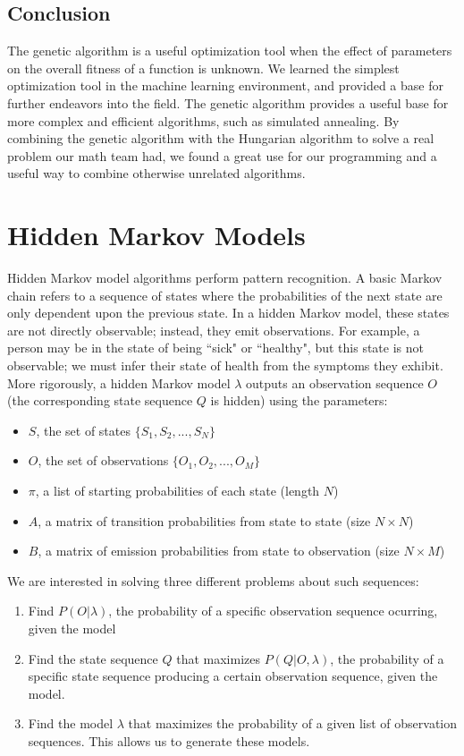 \documentclass[11pt,a4paper]{article}
\begin{document}
\subsection{Conclusion}
\label{Genetic Algorithms:Conclusion}

The genetic algorithm is a useful optimization tool when the effect of parameters on the overall fitness of a function is unknown. We learned the simplest optimization tool in the machine learning environment, and provided a base for further endeavors into the field. The genetic algorithm provides a useful base for more complex and efficient algorithms, such as simulated annealing. By combining the genetic algorithm with the Hungarian algorithm to solve a real problem our math team had, we found a great use for our programming and a useful way to combine otherwise unrelated algorithms.

\section{Hidden Markov Models} 
\label{Hidden Markov Models}

Hidden Markov model algorithms perform pattern recognition. A basic Markov chain refers to a sequence of states where the probabilities of the next state are only dependent upon the previous state. In a hidden Markov model, these states are not directly observable; instead, they emit observations. For example, a person may be in the state of being ``sick" or ``healthy", but this state is not observable; we must infer their state of health from the symptoms they exhibit. More rigorously, a hidden Markov model $\lambda$ outputs an observation sequence $O$ (the corresponding state sequence $Q$ is hidden) using the parameters:

\begin{itemize}
\item $S$, the set of states $\{S_1, S_2, ... , S_N\}$
\item $O$, the set of observations $\{O_1, O_2, ... , O_M\}$
\item $\pi$, a list of starting probabilities of each state (length $N$)
\item $A$, a matrix of transition probabilities from state to state (size $N \times N$)
\item $B$, a matrix of emission probabilities from state to observation (size $N \times M$) 
\end{itemize}

We are interested in solving three different problems about such sequences:
\begin{enumerate}
\item Find $P(O|\lambda)$, the probability of a specific observation sequence ocurring, given the model
\item Find the state sequence $Q$ that maximizes $P(Q|O, \lambda)$, the probability of a specific state sequence producing a certain observation sequence, given the model.
\item Find the model $\lambda$ that maximizes the probability of a given list of observation sequences. This allows us to generate these models.
\end{enumerate}
\end{document}
